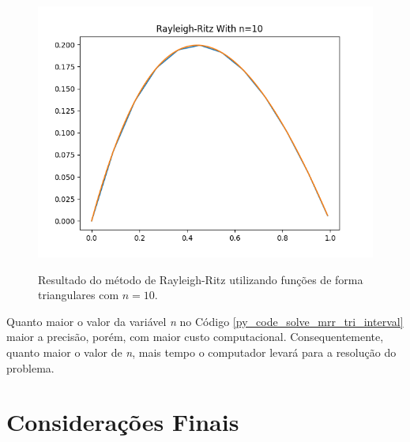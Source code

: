 \documentclass[
	12pt,				%
	openright,			%
    twoside,			%
	a4paper,			%
	english,			%
	french,				%
	spanish,			%
	brazil				%
	]{abntex2}
\numberwithin{lema}{chapter}
\numberwithin{teorema}{chapter}
\numberwithin{definicao}{chapter}
\numberwithin{exemplo}{chapter}
\numberwithin{figure}{chapter}
\begin{document}
\begin{figure}[h]
	\caption{Resultado do método de Rayleigh-Ritz utilizando funções de forma triangulares com $n=10$.}
	\centering
	\includegraphics[scale=0.6]{../figuras/code/code_plot_mrr_triangulate_n10.png}
	\label{fig:code_plot_mrr_triangulate_n10}
\end{figure}

Quanto maior o valor da variável \textit{n} no Código \ref{py_code_solve_mrr_tri_interval} maior a precisão, porém, com maior custo computacional. Consequentemente, quanto maior o valor de \textit{n}, mais tempo o computador levará para a resolução do problema.

\chapter*{Considerações Finais}

\postextual



%
%
\end{document}
